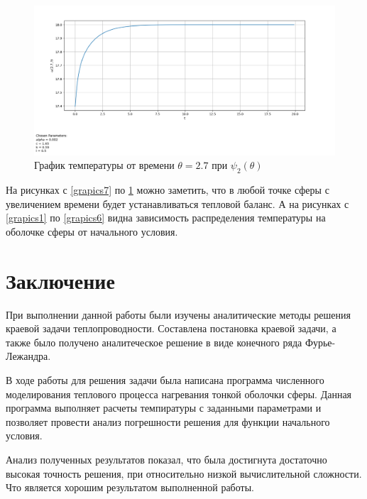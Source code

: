 {{\begin{figure}[H]
    \centering                             
	\includegraphics[width=\textwidth,height=\textheight,keepaspectratio]{pos/var_2_z_2t7.png}                 
	\caption{ График температуры от времени $\theta=2.7$ при $\psi_2(\theta)$}
	\label{grapics12}                           
\end{figure}              
                         
                     
    На рисунках с \ref{grapics7} по \ref{grapics12} можно заметить, что в любой точке сферы с увеличением времени
    будет устанавливаться тепловой баланс. А на рисунках с \ref{grapics1} по  \ref{grapics6} видна зависимость распределения температуры на оболочке сферы от начального условия. 
    
}


\newpage
{}
{}


\section*{Заключение}
{
    При выполнении данной работы были изучены аналитические методы решения краевой задачи теплопроводности. Составлена постановка краевой задачи, а также было получено аналитеческое решение в виде конечного ряда Фурье-Лежандра.
    
    
    В ходе работы для решения задачи была написана программа численного моделирования теплового процесса нагревания тонкой оболочки сферы. Данная программа выполняет расчеты темпиратуры с заданными параметрами и позволяет провести анализ погрешности решения для функции начального условия.
     
     
     Анализ полученных результатов показал, что была достигнута достаточно высокая точность решения, при относительно низкой вычислительной сложности.
     Что является хорошим результатом выполненной работы. 
    
}}
